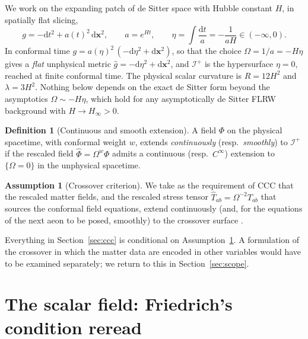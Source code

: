 \documentclass[11pt,a4paper]{article}
\theoremstyle{definition}
\newtheorem{definition}{Definition}
\newtheorem{assumption}{Assumption}
\newcommand{\scri}{\mathscr{I}^{+}}
\newcommand{\dd}{\mathrm{d}}
\newcommand{\hg}{\hat g}
\newcommand{\hT}{\hat T}
\begin{document}
We work on the expanding patch of de Sitter space with Hubble constant $H$, in spatially flat slicing,
\begin{equation}
g=-\dd t^{2}+a(t)^{2}\,\dd\mathbf{x}^{2},\qquad a=e^{Ht},\qquad
\eta=\int\frac{\dd t}{a}=-\frac{1}{aH}\in(-\infty,0).
\end{equation}
In conformal time $g=a(\eta)^{2}\,(-\dd\eta^{2}+\dd\mathbf{x}^{2})$, so that the choice $\Omega=1/a=-H\eta$ gives a \emph{flat} unphysical metric $\hg=-\dd\eta^{2}+\dd\mathbf{x}^{2}$, and $\scri$ is the hypersurface $\eta=0$, reached at finite conformal time. The physical scalar curvature is $R=12H^{2}$ and $\lambda=3H^{2}$. Nothing below depends on the exact de Sitter form beyond the asymptotics $\Omega\sim-H\eta$, which hold for any asymptotically de Sitter FLRW background with $H\to H_{\infty}>0$.

\begin{definition}[Continuous and smooth extension]
A field $\Phi$ on the physical spacetime, with conformal weight $w$, extends \emph{continuously} (resp.\ \emph{smoothly}) to $\scri$ if the rescaled field $\hat\Phi=\Omega^{w}\Phi$ admits a continuous (resp.\ $C^{\infty}$) extension to $\{\Omega=0\}$ in the unphysical spacetime.
\end{definition}

\begin{assumption}[Crossover criterion]
\label{ass:crossover}
We take as the requirement of CCC that the rescaled matter fields, and the rescaled stress tensor $\hT_{ab}=\Omega^{-2}T_{ab}$ that sources the conformal field equations, extend continuously (and, for the equations of the next aeon to be posed, smoothly) to the crossover surface \cite{Tod2013,MeissnerPenrose2025}.
\end{assumption}

Everything in Section~\ref{sec:ccc} is conditional on Assumption~\ref{ass:crossover}. A formulation of the crossover in which the matter data are encoded in other variables would have to be examined separately; we return to this in Section~\ref{sec:scope}.

\section{The scalar field: Friedrich's condition reread}
\label{sec:scalar}
\end{document}
